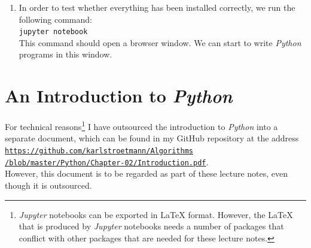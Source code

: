 \begin{enumerate}[(a)]
\begin{enumerate}
            This command installs additional libraries that will be needed later.
      \item In order to test whether everything has been installed correctly, we run the following command:
            \\[0.2cm]
            \hspace*{1.3cm}
            \texttt{jupyter notebook}
            \\[0.2cm]
            This command should open a browser window.  We can start to write \textsl{Python} programs in this window.
      \end{enumerate}
\end{enumerate}

\section{An Introduction to \textsl{Python}}
For technical reasons\footnote{\textsl{Jupyter} notebooks can be exported in {\LaTeX} format.  However, the 
{\LaTeX} that is produced by \textsl{Jupyter} notebooks needs a number of packages that conflict with other
packages that are needed for these lecture notes.}
I have outsourced the introduction to \textsl{Python} into a separate document, which can be found in my GitHub
repository at the address
\\[0.2cm]
\hspace*{1.3cm}
\href{https://github.com/karlstroetmann/Algorithms/blob/master/Python/Chapter-02/Introduction.pdf}{\texttt{https://github.com/karlstroetmann/Algorithms\\
\hspace*{2.3cm}    
    /blob/master/Python/Chapter-02/Introduction.pdf}}.
\\[0.2cm]
However, this document is to be regarded as part of these lecture notes, even though it is outsourced.
\pagebreak

